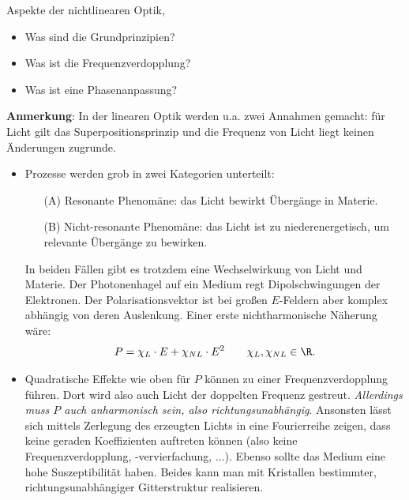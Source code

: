 \documentclass{subfiles}
\begin{document}
    \begin{Frage}
        Aspekte der nichtlinearen Optik,
        \begin{itemize}[label=$\to$]
            \item Was sind die Grundprinzipien?
            \item Was ist die Frequenzverdopplung?
            \item Was ist eine Phasenanpassung?
        \end{itemize}
    \end{Frage}
    \begin{Antwort}
        \textbf{Anmerkung}: In der linearen Optik werden u.a. zwei Annahmen gemacht: für Licht gilt das Superpositionsprinzip und die Frequenz von Licht liegt keinen Änderungen zugrunde. 

        \begin{itemize}[label=$\to$]
            \item Prozesse werden grob in zwei Kategorien unterteilt:
            \begin{itemize}
                \item[(A)] Resonante Phenomäne: das Licht bewirkt Übergänge in Materie.
                \item[(B)] Nicht-resonante Phenomäne: das Licht ist zu niederenergetisch, um relevante Übergänge zu bewirken.
            \end{itemize}
            In beiden Fällen gibt es trotzdem eine Wechselwirkung von Licht und Materie. Der Photonenhagel auf ein Medium regt Dipolschwingungen der Elektronen. Der Polarisationsvektor ist bei großen $E$-Feldern aber komplex abhängig von deren Auslenkung. Einer erste nichtharmonische Näherung wäre:
            \[
                P = \chi_L\cdot E + \chi_{NL} \cdot E^2\qquad \chi_L,\chi_{NL}\in\R.    
            \]

            \item Quadratische Effekte wie oben für $P$ können zu einer Frequenzverdopplung führen. Dort wird also auch Licht der doppelten Frequenz gestreut. \textit{Allerdings muss $P$ auch anharmonisch sein, also richtungsunabhängig}. Ansonsten lässt sich mittels Zerlegung des erzeugten Lichts in eine Fourierreihe zeigen, dass keine geraden Koeffizienten auftreten können (also keine Frequenzverdopplung, -vervierfachung, ...). Ebenso sollte das Medium eine hohe Suszeptibilität haben. Beides kann man mit Kristallen bestimmter, richtungsunabhängiger Gitterstruktur realisieren.\\
            

\end{itemize}
\end{Antwort}
\end{document}
